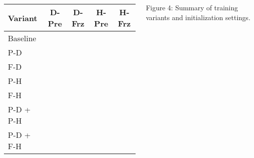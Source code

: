 \documentclass[25pt, a0paper, portrait]{tikzposter}
\newcommand{\cmark}{\textcolor{green!70!black}{\ding{51}}} %
\newcommand{\xmark}{\textcolor{red!70!black}{\ding{55}}}   %
\begin{document}
\begin{columns}
{\begin{minipage}[h]{0.43\linewidth}
    \end{minipage}%
    \begin{minipage}[h]{0.51\linewidth}
        \centering
        \begin{tabular}{lcccc}
        \toprule
        \textbf{Variant} & \textbf{D-Pre} & \textbf{D-Frz} & \textbf{H-Pre} & \textbf{H-Frz} \\
        \midrule
        Baseline    & \xmark & \xmark & \xmark & \xmark \\
        P-D         & \cmark & \xmark & \xmark & \xmark \\
        F-D         & \cmark & \cmark & \xmark & \xmark \\
        P-H         & \xmark & \xmark & \cmark & \xmark \\
        F-H         & \xmark & \xmark & \cmark & \cmark \\
        P-D + P-H   & \cmark & \xmark & \cmark & \xmark \\
        P-D + F-H   & \cmark & \xmark & \cmark & \cmark \\
        \bottomrule
        \end{tabular}
        Figure 4: Summary of training variants and initialization settings.
    \end{minipage}%
    }




\end{columns}
\end{document}
